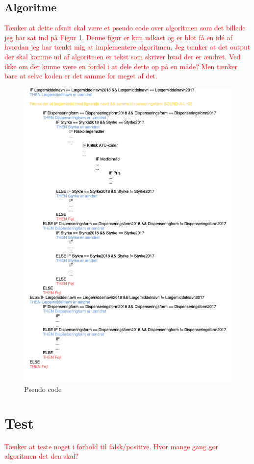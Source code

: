 \section{Algoritme}
\textcolor{red}{Tænker at dette afsnit skal være et pseudo code over algoritmen som det billede jeg har sat ind på Figur  \ref{fig:pseudo}. Denne figur er kun udkast og er blot få en idé af hvordan jeg har tænkt mig at implementere algoritmen. Jeg tænker at det output der skal komme ud af algoritmen er tekst som skriver hvad der er ændret. Ved ikke om der kunne  være en fordel i at dele dette op på en måde? Men tænker bare at selve koden er det samme for meget af det.}
\begin{figure}[H]\centering	\includegraphics[width=1\textwidth]{billeder/Pseudo.png} 
	\caption{Pseudo code}
	\label{fig:pseudo}  
\end{figure}
\vspace{-0.5cm}


\chapter{Test}
\textcolor{red}{Tænker at teste noget i forhold til falsk/positive. Hvor mange gang gør algoritmen det den skal?}


